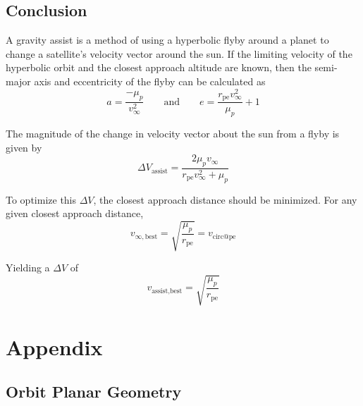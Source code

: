 \documentclass{article}
\begin{document}

\bigskip\bigskip
\subsection{Conclusion}

A gravity assist is a method of using a hyperbolic flyby around a planet to change a satellite's velocity vector around the sun. If the limiting velocity of the hyperbolic orbit and the closest approach altitude are known, then the semi-major axis and eccentricity of the flyby can be calculated as
$$a=\frac{-\mu_p}{v_\infty^2}\qquad\text{and}\qquad e=\frac{r_\text{pe}v_\infty^2}{\mu_p}+1$$

The magnitude of the change in velocity vector about the sun from a flyby is given by
$$\Delta V_\text{assist}=\frac{2\mu_p v_\infty}{r_\text{pe}v_\infty^2+\mu_p}$$

To optimize this $\Delta V$, the closest approach distance should be minimized. For any given closest approach distance,
$$v_{\infty,\text{best}}=\sqrt{\frac{\mu_p}{r_\text{pe}}}=v_\text{circ@pe}$$

Yielding a $\Delta V$ of
$$v_\text{assist,best} = \sqrt{\frac{\mu_p}{r_\text{pe}}}$$

\pagebreak
\section{Appendix}
\bigskip\bigskip
\subsection{Orbit Planar Geometry}
\end{document}
